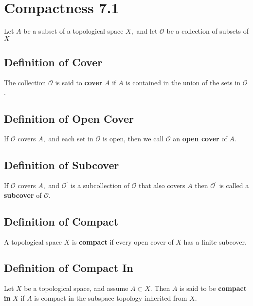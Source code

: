 \documentclass[12pt]{article}
\begin{document}
	\section{Compactness 7.1}
	Let $A$ be a subset of a topological space $X ,$ and let $\mathcal { O }$ be a collection of subsets of $ X $
	\subsection{Definition of Cover}
	The collection $\mathcal { O }$ is said to \textbf{cover} $A$ if $A$ is
	contained in the union of the sets in $\mathcal { O }$ .
	\subsection{Definition of Open Cover}
	If $\mathcal { O }$ covers $A ,$ and each set in $\mathcal { O }$ is open, then we call $\mathcal { O }$ an \textbf{ open cover} of $A .$ 
	\subsection{Definition of Subcover}
	If $\mathcal { O }$ covers $A ,$ and $\mathcal { O } ^ { \prime }$ is a subcollection of $\mathcal { O }$ that also covers $A$
	then $\mathcal { O } ^ { \prime }$ is called a \textbf{subcover} of $\mathcal { O } .$\\
	
	\subsection{Definition of Compact}
	A topological space $X$ is \textbf{compact} if every open cover of $ X $ has a finite subcover.
	
	\subsection{Definition of Compact In}
	Let $X$ be a topological space, and assume $A \subset X .$ Then $A$ is said to be \textbf{compact in} $X$ if $A$ is compact in the subspace topology inherited from $X .$ 
	
	
\end{document}
